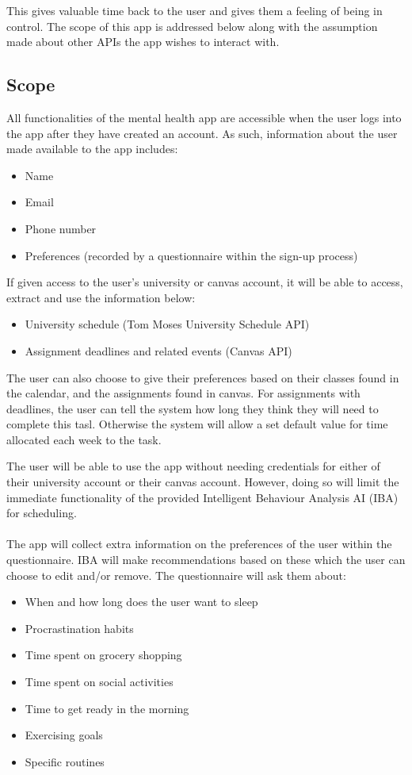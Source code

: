 \documentclass[a4paper,11pt]{article} %
\begin{document}
This gives valuable time back to the user and gives them a feeling of being in control. The scope 
of this app is addressed below along with the assumption made about other APIs the app wishes 
to interact with.
\newpage
\subsection{Scope}
All functionalities of the mental health app are accessible when the user logs into the app after they 
have created an account. As such, information about the user made available to the app includes:
\begin{itemize}
    \item Name
    \item Email
    \item Phone number
    \item Preferences (recorded by a questionnaire within the sign-up process)
\end{itemize}
If given access to the user's university or canvas account, it will be able to access, extract and use 
the information below:
\begin{itemize}
    \item University schedule (Tom Moses University Schedule API)
    \item Assignment deadlines and related events (Canvas API)
\end{itemize}

The user can also choose to give their preferences based on their classes found in the calendar, 
and the assignments found in canvas.
For assignments with deadlines, the user can tell the system how long they think they will need 
to complete this tasl.
Otherwise the system will allow a set default value for time allocated each week to the task. 

The user will be able to use the app without needing credentials for either of their university account 
or their canvas account. However, doing so will limit the immediate functionality of the provided 
Intelligent Behaviour Analysis AI (IBA) for scheduling.
\\
\\
The app will collect extra information on the preferences of the user within the questionnaire. IBA will make recommendations based on these which the user can choose to edit and/or remove. The questionnaire will ask them about:
\begin{itemize}
    \item When and how long does the user want to sleep
    \item Procrastination habits
    \item Time spent on grocery shopping
    \item Time spent on social activities
    \item Time to get ready in the morning
    \item Exercising goals
    \item Specific routines
\end{itemize}
\end{document}
